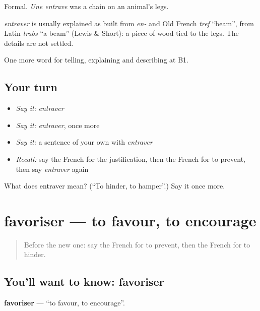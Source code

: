 Formal. \emph{Une entrave} was a chain on an animal's legs.

\begin{cousinweb}
\emph{entraver} is usually explained as built from \emph{en-} and Old French \emph{tref} \textquotedblleft{}beam\textquotedblright{}, from Latin \emph{trabs} \textquotedblleft{}a beam\textquotedblright{} (Lewis \& Short): a piece of wood tied to the legs. The details are not settled.
\end{cousinweb}

\begin{grammarlens}[title={What you've built}]
One more word for telling, explaining and describing at B1.
\end{grammarlens}

\subsection*{Your turn}
\begin{itemize}
\raggedright
  \item \emph{Say it:} \emph{entraver}
  \item \emph{Say it:} \emph{entraver}, once more
  \item \emph{Say it:} a sentence of your own with \emph{entraver}
  \item \emph{Recall:} say the French for the justification, then the French for to prevent, then say \emph{entraver} again
\end{itemize}

\begin{tcolorbox}[breakable,colback=teal!4,colframe=teal!35!black,title={Before you move on}]
What does entraver mean? (\textquotedblleft{}To hinder, to hamper\textquotedblright{}.) Say it once more.
\end{tcolorbox}
\section[favoriser]{favoriser — to favour, to encourage}

\label{lesson:FR-C352-favoriser}



\begin{quote}
Before the new one: say the French for to prevent, then the French for to hinder.
\end{quote}

\subsection*{You'll want to know: favoriser}
\textbf{favoriser} — \textquotedblleft{}to favour, to encourage\textquotedblright{}.

